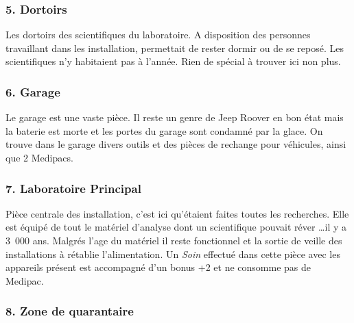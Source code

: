 \subsubsection{5. Dortoirs}
Les dortoirs des scientifiques du laboratoire. A disposition des personnes travaillant dans les installation, permettait de rester dormir ou de se reposé. Les scientifiques n’y habitaient pas à l’année. Rien de spécial à trouver ici non plus.

\subsubsection{6. Garage}
Le garage est une vaste pièce. Il reste un genre de Jeep Roover en bon état mais la baterie est morte et les portes du garage sont condamné par la glace. On trouve dans le garage divers outils et des pièces de rechange pour véhicules, ainsi que 2 Medipacs.

\subsubsection{7. Laboratoire Principal}
Pièce centrale des installation, c’est ici qu’étaient faites toutes les recherches. Elle est équipé de tout le matériel d’analyse dont un scientifique pouvait réver \ldots il y a 3~000 ans. Malgrés l'age du matériel il reste fonctionnel et la sortie de veille des installations à rétablie l’alimentation. Un \textit{Soin} effectué dans cette pièce avec les appareils présent est accompagné d’un bonus +2 et ne consomme pas de Medipac.

\subsubsection{8. Zone de quarantaire}

